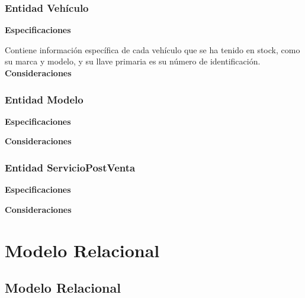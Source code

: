 \documentclass[12pt]{article}
\begin{document}
\subsubsection{Entidad Vehículo}
\textbf{Especificaciones}

Contiene información específica de cada vehículo que se ha tenido en stock, como su marca y modelo, y su llave primaria es su número de identificación.
\textbf{Consideraciones}



\subsubsection{Entidad Modelo}
\textbf{Especificaciones}

\textbf{Consideraciones}


\subsubsection{Entidad ServicioPostVenta}
\textbf{Especificaciones}

\textbf{Consideraciones}


\section{Modelo Relacional}

\subsection{Modelo Relacional}
\end{document}
